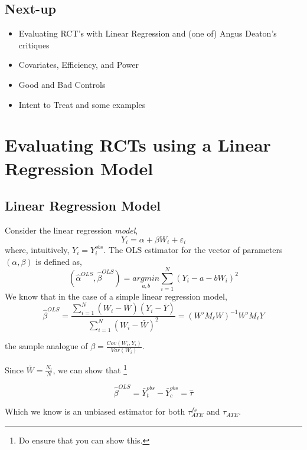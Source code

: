 \documentclass[
  letterpaper,
  DIV=11,
  numbers=noendperiod]{scrreprt}
\providecommand{\tightlist}{%
  \setlength{\itemsep}{0pt}\setlength{\parskip}{0pt}}\usepackage{longtable,booktabs,array}
\theoremstyle{definition}
\theoremstyle{remark}
\begin{document}
\hypertarget{next-up}{%
\subsection{Next-up}\label{next-up}}

\begin{itemize}
\tightlist
\item
  Evaluating RCT's with Linear Regression and (one of) Angus Deaton's
  critiques
\item
  Covariates, Efficiency, and Power\\
\item
  Good and Bad Controls
\item
  Intent to Treat and some examples
\end{itemize}

\hypertarget{evaluating-rcts-using-a-linear-regression-model}{%
\section{Evaluating RCTs using a Linear Regression
Model}\label{evaluating-rcts-using-a-linear-regression-model}}

\hypertarget{linear-regression-model}{%
\subsection{Linear Regression Model}\label{linear-regression-model}}

Consider the linear regression \emph{model}, \[
            Y_i = \alpha+\beta W_i + \varepsilon_i
\] where, intuitively, \(Y_i = Y^{obs}_i\). The OLS estimator for the
vector of parameters \((\alpha,\beta)\) is defined as, \[
            (\hat{\alpha}^{OLS},\hat{\beta}^{OLS}) = \underset{a,b}{argmin} \sum_{i=1}^{N}(Y_i-a-b W_i)^2
\] We know that in the case of a simple linear regression model, \[
            \hat{\beta}^{OLS} = \frac{\sum_{i=1}^{N}(W_i-\bar{W})(Y_i-\bar{Y})}{\sum_{i=1}^{N}(W_i-\bar{W})^2} = (W'M_\ell W)^{-1}W'M_\ell Y
\]

the sample analogue of \(\beta = \frac{Cov(W_i,Y_i)}{Var(W_i)}\).

Since \(\bar{W}=\frac{N_t}{N}\), we can show that \footnote{Do ensure
  that you can show this.}

\[
            \hat{\beta}^{OLS} = \bar{Y}^{obs}_t-\bar{Y}^{obs}_c = \hat{\tau}
\]

Which we know is an unbiased estimator for both \(\tau_{ATE}^{fs}\) and
\(\tau_{ATE}\).
\end{document}
